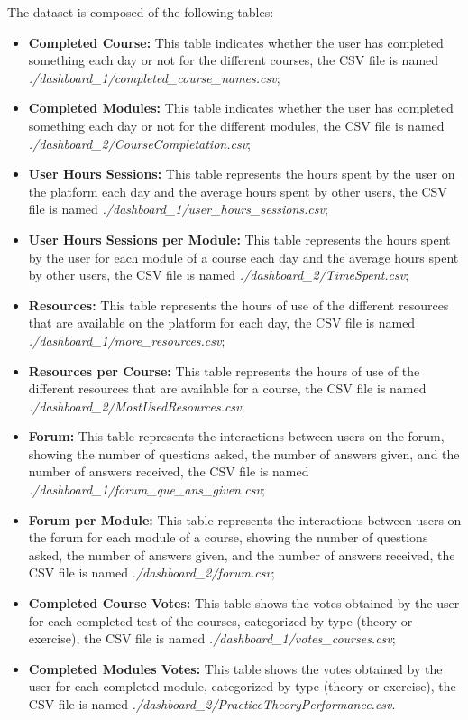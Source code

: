 The dataset is composed of the following tables:
\begin{itemize}
    \item 
        \textbf{Completed Course:} This table indicates whether the user has completed something each 
        day or not for the different courses, the CSV file is named \\ \textit{./dashboard\_1/completed\_course\_names.csv};
    \item 
        \textbf{Completed Modules:} This table indicates whether the user has completed something each 
        day or not for the different modules, the CSV file is named \\ \textit{./dashboard\_2/CourseCompletation.csv};
    \item 
        \textbf{User Hours Sessions:} This table represents the hours spent by the user on the platform 
        each day and the average hours spent by other users, the CSV file 
        is named \textit{./dashboard\_1/user\_hours\_sessions.csv};
    \item 
        \textbf{User Hours Sessions per Module:} This table represents the hours spent by the user for each module
        of a course each day and the average hours spent by other users, the CSV file 
        is named \textit{./dashboard\_2/TimeSpent.csv};
    \item 
        \textbf{Resources:} This table represents the hours of use of the different resources that are
        available on the platform for each day, the CSV file is named \textit{./dashboard\_1/more\_resources.csv};
    \item 
        \textbf{Resources per Course:} This table represents the hours of use of the different resources that are
        available for a course, the CSV file is named \textit{./dashboard\_2/MostUsedResources.csv};
    \item 
        \textbf{Forum:} This table represents the interactions between users on the forum, showing the number
        of questions asked, the number of answers given, and the number of answers received, the CSV file is named 
        \textit{./dashboard\_1/forum\_que\_ans\_given.csv};
    \item 
        \textbf{Forum per Module:} This table represents the interactions between users on the forum for each module of a course, showing the number
        of questions asked, the number of answers given, and the number of answers received, the CSV file is named 
        \textit{./dashboard\_2/forum.csv};
    \item 
        \textbf{Completed Course Votes:} This table shows the votes obtained by the user for each completed test of the courses, 
        categorized by type (theory or exercise), the CSV file is named \textit{./dashboard\_1/votes\_courses.csv};
    \item 
        \textbf{Completed Modules Votes:} This table shows the votes obtained by the user for each completed module, 
        categorized by type (theory or exercise), the CSV file is named \textit{./dashboard\_2/PracticeTheoryPerformance.csv}.
\end{itemize}